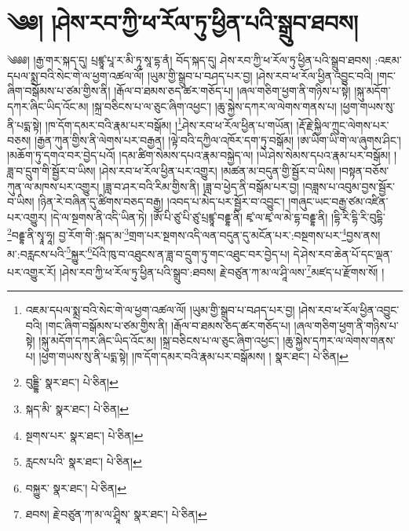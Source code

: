\setcounter{footnote}{0} 
\chapter{༄༅། །ཤེས་རབ་ཀྱི་ཕ་རོལ་ཏུ་ཕྱིན་པའི་སྒྲུབ་ཐབས།}༄༅༅། །རྒྱ་གར་སྐད་དུ། པྲཛྙཱ་པཱ་ར་མི་ཏཱ་སཱ་དྷ་ནཾ། བོད་སྐད་དུ། ཤེས་རབ་ཀྱི་ཕ་རོལ་ཏུ་ཕྱིན་པའི་སྒྲུབ་ཐབས། :འཇམ་དཔལ་སྨྲ་བའི་སེང་གེ་ལ་ཕྱག་འཚལ་ལོ། །ཡུམ་གྱི་སྒྲུབ་པ་བཤད་པར་བྱ། །ཤེས་རབ་ཕ་རོལ་ཕྱིན་འབྱུང་བའི། །གང་ཞིག་བསྒོམས་པ་ཙམ་གྱིས་ནི། །རྒོལ་བ་ཐམས་ཅད་ཚར་གཅོད་པ། །ཞལ་གཅིག་ཕྱག་ནི་གཉིས་པ་སྟེ། །སྐུ་མདོག་དཀར་ཞིང་ཡིད་འོང་མ། །སྐྲ་བཅིངས་པ་ལ་ཅུང་ཞིག་འཕྱང་། །ཆུ་སྐྱེས་དཀར་ལ་ལེགས་གནས་པ། །ཕྱག་གཡས་སུ་ནི་པདྨ་སྟེ། །ཁ་དོག་དམར་བའི་རྣམ་པར་བསྒོམ། །\footnote{འཇམ་དཔལ་སྨྲ་བའི་སེང་གེ་ལ་ཕྱག་འཚལ་ལོ། །ཡུམ་གྱི་སྒྲུབ་པ་བཤད་པར་བྱ། །ཤེས་རབ་ཕ་རོལ་ཕྱིན་འབྱུང་བའི། །གང་ཞིག་བསྒོམས་པ་ཙམ་གྱིས་ནི། །རྒོལ་བ་ཐམས་ཅད་ཚར་གཅོད་པ། །ཞལ་གཅིག་ཕྱག་ནི་གཉིས་པ་སྟེ། །སྐུ་མདོག་དཀར་ཞིང་ཡིད་འོང་མ། །སྐྲ་བཅིངས་པ་ལ་ཅུང་ཞིག་འཕྱང་། །ཆུ་སྐྱེས་དཀར་ལ་ལེགས་གནས་པ། །ཕྱག་གཡས་སུ་ནི་པདྨ་སྟེ། །ཁ་དོག་དམར་བའི་རྣམ་པར་བསྒོམས། །  སྣར་ཐང་།  པེ་ཅིན། }ཤེས་རབ་ཕ་རོལ་ཕྱིན་པ་གཡོན། །རྡོ་རྗེ་སྐྱིལ་ཀྲུང་ལེགས་པར་བཅས། །རྒྱན་ཀུན་གྱིས་ནི་ལེགས་པར་བརྒྱན། །ལྟེ་བའི་དཀྱིལ་འཁོར་དག་ཏུ་བསྒོམ། །ཨ་ཡིག་ཡི་གེ་ལ་ཞུགས་ཤིང་། །མཆོག་ཏུ་དགའ་བར་བྱེད་པའོ། །དམ་ཚིག་སེམས་དཔའ་རྣམ་བསྐྱེད་ལ། །ཡེ་ཤེས་སེམས་དཔའ་རྣམ་པར་བསྒོམ། །ཟླ་བ་དྲུག་གི་སྦྱོར་བ་ཡིས། །ཤེས་རབ་ཕ་རོལ་ཕྱིན་པར་འགྱུར། །མཚན་མ་བདུན་གྱི་སྦྱོར་བ་ཡིས། །བསྟན་བཅོས་ཀུན་ལ་མཁས་པར་འགྱུར། །ཟླ་བ་ཤར་བའི་རིམ་གྱིས་ནི། །ཟླ་བ་ཕྱེད་ནི་བསྒོམ་པར་བྱ། །བཟླས་པ་འབུམ་བྱས་སྦྱོར་བ་ཡིས། །ཉིན་རེ་བཞིན་དུ་ཚིགས་བཅད་བརྒྱ། །འབད་པ་མེད་པར་སྦྱོར་བ་འབྱུང་། །གཞུང་ཡང་བརྒྱ་ཙམ་འཛིན་པར་འགྱུར། །དེ་ལ་སྔགས་ནི་འདི་ཡིན་ཏེ། །ཨོཾ་པི་ཙུ་པི་ཙུ་པྲཛྙཱ་བརྡྷ་ནི། ཛྭ་ལ་ཛྭ་ལ་མེ་དྷ་བརྡྷ་ནི། །དྷི་རི་དྷི་རི་བུདྷི་\footnote{བུདྡྷི་  སྣར་ཐང་།  པེ་ཅིན། }བརྡྷ་ནི་སྭཱ་ཧཱ། བྱ་རོག་གི་:སྐད་མ་\footnote{སྐད་མི་  སྣར་ཐང་།  པེ་ཅིན། }གྲག་པར་སྔགས་འདི་ལན་བདུན་དུ་མངོན་པར་:བསྔགས་པར་\footnote{སྔགས་པར་  སྣར་ཐང་།  པེ་ཅིན། }བྱས་ནས། མ་:བརླངས་པའི་\footnote{རླངས་པའི་  སྣར་ཐང་།  པེ་ཅིན། }སྐྱུར་\footnote{བསྐྱུར་  སྣར་ཐང་།  པེ་ཅིན། }པོའི་ཁུ་བ་འཐུངས་ན་ཟླ་བ་དྲུག་ཏུ་གང་འཐུང་བར་བྱེད་པ། དེ་ཤེས་རབ་ཆེན་པོ་དང་ལྡན་པར་འགྱུར་རོ། །ཤེས་རབ་ཀྱི་ཕ་རོལ་ཏུ་ཕྱིན་པའི་སྒྲུབ་:ཐབས། རྗེ་བཙུན་ཀ་མ་ལ་ཤཱི་ལས་\footnote{ཐབས། རྗེ་བཙུན་ཀ་མ་ལ་ཤྲཱིས་  སྣར་ཐང་།  པེ་ཅིན། }མཛད་པ་རྫོགས་སོ། ། 